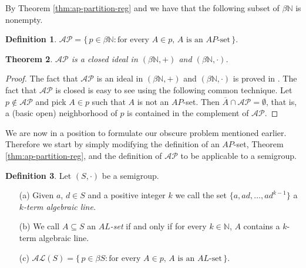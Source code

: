 \documentclass[12pt,showtrims]{memoir}
\theoremstyle{plain}
\newtheorem{thm}{Theorem}[section]
\theoremstyle{definition}
\newtheorem{defn}[thm]{Definition}
\newcommand{\bbN}{\mathbb{N}}
\newcommand{\AP}{\mathcal{AP}}
\newcommand{\AL}{\mathcal{AL}}
\begin{document}
By Theorem \ref{thm:ap-partition-reg} and \cite[Theorem 3.11]{Hindman:1998fk} we have that the following subset of $\beta \bbN$ is nonempty.

\begin{defn}
  $\AP = \{\, p \in \beta \bbN : \mbox{for every $A \in p$, $A$ is an $AP$-set} \,\}.$
\end{defn}

\begin{thm}
  $\AP$ is a closed ideal in $(\beta \bbN, +)$ and $(\beta \bbN, \cdot)$.
\end{thm}
\begin{proof}
  The fact that $\AP$ is an ideal in $(\beta \bbN, +)$ and $(\beta \bbN, \cdot)$ is proved in \cite[Theorem 14.5]{Hindman:1998fk}. 
  The fact that $\AP$ is closed is easy to see using the following common technique.
  Let $p \not\in \AP$ and pick $A \in p$ such that $A$ is not an $AP$-set.
  Then $\overline{A} \cap \AP = \emptyset$, that is, a (basic open) neighborhood of $p$ is contained in the complement of $\AP$.
\end{proof}

We are now in a position to formulate our obscure problem mentioned earlier.
Therefore we start by simply modifying the definition of an $AP$-set, Theorem \ref{thm:ap-partition-reg}, and the definition of $\AP$ to be applicable to a semigroup.

\begin{defn}
  Let $(S, \cdot)$ be a semigroup.
  \begin{itemize}
    \item[(a)] Given $a$, $d \in S$ and a positive integer $k$ we call the set $\{a, ad, \ldots, ad^{k-1}\}$ a \textsl{$k$-term algebraic line}. 

    \item[(b)] We call $A \subseteq S$ an \textsl{$AL$-set} if and only if for every $k \in \bbN$, $A$ contains a $k$-term algebraic line.

    \item[(c)] $\AL(S) = \{\, p \in \beta S : \mbox{for every $A \in p$, $A$ is an $AL$-set} \,\}$.
  \end{itemize}
\end{defn}
\end{document}
